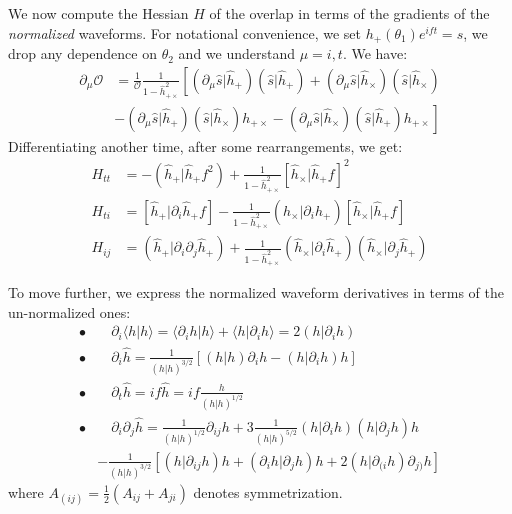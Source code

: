 \documentclass[twocolumn,showpacs,preprintnumbers,nofootinbib,prd,
superscriptaddress,10pt]{revtex4-2}
\newcommand{\scalar}[2]{\langle #1|#2 \rangle}
\newcommand{\rescalar}[2]{( #1 |#2 )}
\newcommand{\imscalar}[2]{[ #1|#2 ]}
\begin{document}
We now compute the Hessian $H$ of the overlap in terms of the gradients of the {\it normalized} waveforms. For notational convenience, we set $h_+(\theta_1)e^{ift} = s$, we drop any dependence on $\theta_2$ and we understand $\mu = {i, t}$.
We have:
\begin{align}\label{eq:overlap_grads}
	\partial_{\mu} \mathcal{O} &= \frac{1}{\mathcal{O}} \frac{1}{1-\hat{h}^2_{+\times}}
	\left[
	\rescalar{\partial_\mu\hat{s}}{\hat{h}_+}\rescalar{\hat{s}}{\hat{h}_+} 
	+ \rescalar{\partial_\mu\hat{s}}{\hat{h}_\times}\rescalar{\hat{s}}{\hat{h}_\times} \right. \nonumber \\
	&\left. - \rescalar{\partial_\mu\hat{s}}{\hat{h}_+}\rescalar{\hat{s}}{\hat{h}_\times}h_{+\times}
	- \rescalar{\partial_\mu\hat{s}}{\hat{h}_\times}\rescalar{\hat{s}}{\hat{h}_+}h_{+\times}
	\right]
\end{align}
Differentiating another time, after some rearrangements, we get:
\begin{align}
H_{tt} &= - \rescalar{\hat{h}_+}{\hat{h}_+f^2}
			+ \frac{1}{1-\hat{h}^2_{+\times}} \imscalar{\hat{h}_\times}{\hat{h}_+f}^2 \label{eq:H_tt}\\
H_{ti} &= \imscalar{\hat{h}_+}{\partial_i \hat{h}_+f}
			- \frac{1}{1-\hat{h}^2_{+\times}} \rescalar{\hat{h}_\times}{\partial_i\hat{h}_+} \imscalar{\hat{h}_\times}{\hat{h}_+f} \label{eq:H_ti}\\
H_{ij} &= \rescalar{\hat{h}_+}{\partial_i\partial_j\hat{h}_+}
			+ \frac{1}{1-\hat{h}^2_{+\times}} \rescalar{\hat{h}_\times}{\partial_i\hat{h}_+} \rescalar{\hat{h}_\times}{\partial_j\hat{h}_+} \label{eq:H_ij}
\end{align}

To move further, we express the normalized waveform derivatives in terms of the un-normalized ones:
\begin{align*}
	\bullet&\quad \partial_i \scalar{h}{h} = \scalar{\partial_i h}{h}+ \scalar{h}{\partial_i h} = 2 \rescalar{h}{\partial_i h} \\
	\bullet&\quad \partial_i \hat{h} =\frac{1}{\rescalar{h}{h}^{3/2}} \left[ \rescalar{h}{h}\partial_i h -  \rescalar{h}{\partial_i h} h \right]
	\\
	\bullet &\quad \partial_t \hat{h} = i f \hat{h} = i f \frac{h}{\rescalar{h}{h}^{1/2}} \\
	\bullet &\quad \partial_i \partial_j \hat{h} = \frac{1}{\rescalar{h}{h}^{1/2}} \partial_{ij}h 	+3 \frac{1}{\rescalar{h}{h}^{5/2}} \rescalar{h}{\partial_i h}\rescalar{h}{\partial_j h}h \\
	&- \frac{1}{\rescalar{h}{h}^{3/2}} \left[\rescalar{h}{ \partial_{ij} h} h + \rescalar{\partial_i h}{\partial_j h}  h
		+2\rescalar{h}{\partial_{(i} h} \partial_{j)} h \right]
\end{align*}
where $A_{(ij)} = \frac{1}{2}(A_{ij}+A_{ji})$ denotes symmetrization.
\end{document}

